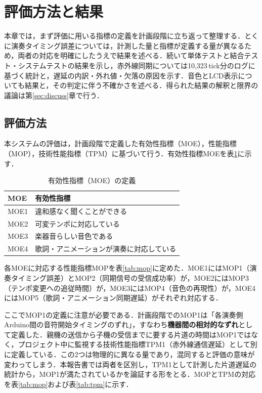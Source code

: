 \documentclass[uplatex,dvipdfmx]{jlreq}
\begin{document}
\section{評価方法と結果}
\label{sec:eval}

本章では，まず評価に用いる指標の定義を計画段階に立ち返って整理する．とくに演奏タイミング誤差については，計測した量と指標が定義する量が異なるため，両者の対応を明確にしたうえで結果を述べる．続いて単体テストと結合テスト・システムテストの結果を示し，赤外線同期については10{,}323\,tick分のログに基づく統計と，遅延の内訳・外れ値・欠落の原因を示す．音色とLCD表示についても結果と，その判定に伴う不確かさを述べる．得られた結果の解釈と限界の議論は第\ref{sec:discuss}章で行う．

\subsection{評価方法}

本システムの評価は，計画段階で定義した有効性指標（MOE），性能指標（MOP），技術性能指標（TPM）に基づいて行う．有効性指標MOEを表\ref{tab:moe}に示す．

\begin{table}[tb]
\caption{有効性指標（MOE）の定義}
\label{tab:moe}
\begin{center}
\small
\begin{tabular}{ll}
\hline
MOE & 有効性指標 \\
\hline
MOE1 & 違和感なく聞くことができる \\
MOE2 & 可変テンポに対応している \\
MOE3 & 楽器音らしい音色である \\
MOE4 & 歌詞・アニメーションが演奏に対応している \\
\hline
\end{tabular}
\end{center}
\end{table}

各MOEに対応する性能指標MOPを表\ref{tab:mop}に定めた．MOE1にはMOP1（演奏タイミング誤差）とMOP2（同期信号の受信成功率）が，MOE2にはMOP3（テンポ変更への追従時間）が，MOE3にはMOP4（音色の再現性）が，MOE4にはMOP5（歌詞・アニメーション同期遅延）がそれぞれ対応する．

ここでMOP1の定義に注意が必要である．計画段階でのMOP1は「各演奏側Arduino間の音符開始タイミングのずれ」，すなわち\textbf{機器間の相対的なずれ}として定義した．親機の送信から子機の受信までに要する片道の時間はMOP1ではなく，プロジェクト中に監視する技術性能指標TPM1（赤外線通信遅延）として別に定義している．この2つは物理的に異なる量であり，混同すると評価の意味が変わってしまう．本報告書では両者を区別し，TPM1として計測した片道遅延の統計から，MOP1が満たされているかを論証する形をとる．MOPとTPMの対応を表\ref{tab:mop}および表\ref{tab:tpm}に示す．
\end{document}
